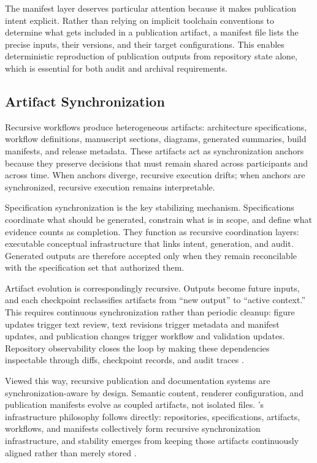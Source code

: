 The manifest layer deserves particular attention because it makes publication intent explicit. Rather than relying on implicit toolchain conventions to determine what gets included in a publication artifact, a manifest file lists the precise inputs, their versions, and their target configurations. This enables deterministic reproduction of publication outputs from repository state alone, which is essential for both audit and archival requirements.

\subsection{Artifact Synchronization}

Recursive workflows produce heterogeneous artifacts: architecture specifications, workflow definitions, manuscript sections, diagrams, generated summaries, build manifests, and release metadata. These artifacts act as synchronization anchors because they preserve decisions that must remain shared across participants and across time. When anchors diverge, recursive execution drifts; when anchors are synchronized, recursive execution remains interpretable.

Specification synchronization is the key stabilizing mechanism. Specifications coordinate what should be generated, constrain what is in scope, and define what evidence counts as completion. They function as recursive coordination layers: executable conceptual infrastructure that links intent, generation, and audit. Generated outputs are therefore accepted only when they remain reconcilable with the specification set that authorized them.

Artifact evolution is correspondingly recursive. Outputs become future inputs, and each checkpoint reclassifies artifacts from ``new output'' to ``active context.'' This requires continuous synchronization rather than periodic cleanup: figure updates trigger text review, text revisions trigger metadata and manifest updates, and publication changes trigger workflow and validation updates. Repository observability closes the loop by making these dependencies inspectable through diffs, checkpoint records, and audit traces \cite{Chandy1985DistributedSnapshots}.

Viewed this way, recursive publication and documentation systems are synchronization-aware by design. Semantic content, renderer configuration, and publication manifests evolve as coupled artifacts, not isolated files. 's infrastructure philosophy follows directly: repositories, specifications, artifacts, workflows, and manifests collectively form recursive synchronization infrastructure, and stability emerges from keeping those artifacts continuously aligned rather than merely stored \cite{Wiener1948Cybernetics,Beer1972BrainFirm}.

